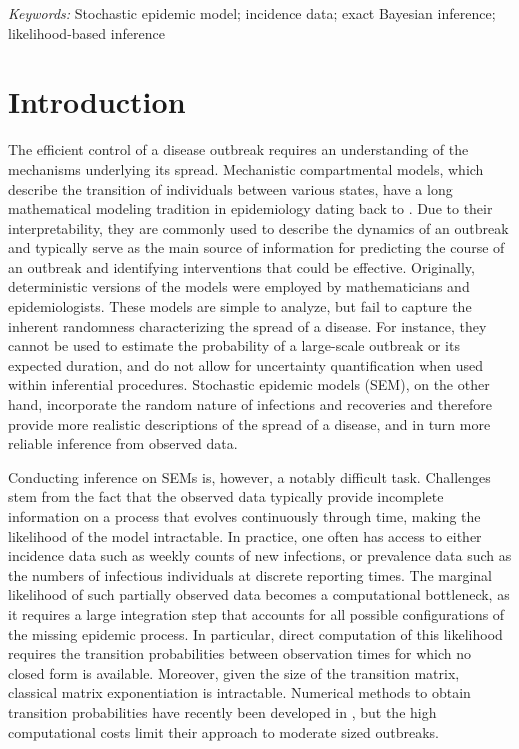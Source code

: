 \documentclass[12pt]{article}
\begin{document}
	\noindent%
	{\it Keywords:}  Stochastic epidemic model; incidence data; exact Bayesian inference; likelihood-based inference
	\vfill
	
	\newpage


\section{Introduction}
\label{sec:intro}

The efficient control of a disease outbreak requires an understanding of the mechanisms underlying its spread. Mechanistic compartmental models, which describe the transition of individuals between various states, have a long mathematical modeling tradition in epidemiology dating back to \cite{Kermack.1927}. Due to their interpretability, they are commonly used to describe the dynamics of an outbreak and typically serve as the main source of information for predicting the course of an outbreak and identifying interventions that could be effective. Originally, deterministic versions of the models were employed by mathematicians and epidemiologists. These models are simple to analyze, but fail to capture the inherent randomness characterizing the spread of a disease. For instance, they cannot be used to estimate the probability of a large-scale outbreak or its expected duration, and do not allow for uncertainty quantification when used within inferential procedures. Stochastic epidemic models (SEM), on the other hand, incorporate the random nature of infections and recoveries and therefore provide more realistic descriptions of the spread of a disease, and in turn more reliable inference from observed data.

Conducting inference on SEMs is, however, a notably difficult task. Challenges stem from the fact that the observed data typically provide incomplete information on a process that evolves continuously through time, making the likelihood of the model intractable. %
In practice, one often has access to either incidence data such as weekly counts of new infections, or prevalence data such as the numbers of infectious individuals at discrete reporting times. The marginal likelihood of such partially observed data becomes a computational bottleneck, as it requires a large integration step that accounts for all possible configurations of the missing epidemic process. In particular, direct computation of this likelihood requires the transition probabilities between observation times for which no closed form is available. Moreover, given the size of the transition matrix, classical matrix exponentiation is intractable.
Numerical methods to obtain transition probabilities have recently been developed in \cite{Ho.2018}, but the high computational costs limit their approach to moderate sized outbreaks.
\end{document}
